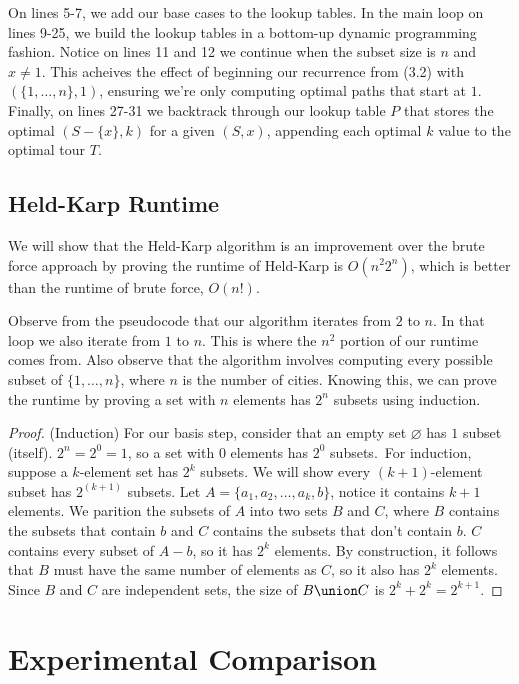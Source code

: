 \documentclass[11pt,fleqn]{article}
\begin{document}
On lines 5-7, we add our base cases to the lookup tables.  In the main loop on
lines 9-25, we build the lookup tables in a bottom-up dynamic programming fashion.
Notice on lines 11 and 12 we continue when the subset size is $n$ and $x \neq 1$.
This acheives the effect of beginning our recurrence from (3.2) with $(\{1,\dots,n\}, 1)$,
ensuring we're only computing optimal paths that start at $1$.  Finally, on lines 27-31
we backtrack through our lookup table $P$ that stores the optimal $(S-\{x\}, k)$
for a given $(S, x)$, appending each optimal $k$ value to the optimal tour $T$.

\subsection{Held-Karp Runtime}
We will show that the Held-Karp algorithm is an improvement over the brute force
approach by proving the runtime of Held-Karp is $O(n^{2}2^n)$, which is better than
the runtime of brute force, $O(n!)$.

Observe from the pseudocode that our algorithm iterates from $2$ to $n$.  In that
loop we also iterate from $1$ to $n$.  This is where the $n^2$ portion of our runtime
comes from.  Also observe that the algorithm involves computing every possible subset
of $\{1,\dots,n\}$, where $n$ is the number of cities.  Knowing this, we can prove the
runtime by proving a set with $n$ elements has $2^n$ subsets using induction.

\begin{proof}
  (Induction) For our basis step, consider that an empty set $\varnothing$ has $1$
  subset (itself).  $2^n = 2^0 = 1$, so a set with $0$ elements has $2^0$ subsets.\
  For induction, suppose a $k$-element set has $2^k$ subsets.  We will show every
  $(k+1)$-element subset has $2^(k+1)$ subsets.  Let $A=\{a_1,a_2,\dots,a_k, b\}$,
  notice it contains $k+1$ elements.  We parition the subsets of $A$ into two sets
  $B$ and $C$, where $B$ contains the subsets that contain $b$ and $C$ contains
  the subsets that don't contain $b$.  $C$ contains every subset of $A-{b}$, so it
  has $2^k$ elements.  By construction, it follows that $B$ must have the same number
  of elements as $C$, so it also has $2^k$ elements.  Since $B$ and $C$ are independent
  sets, the size of $B\union C$ is $2^k + 2^k = 2^{k+1}$.
\end{proof}

\section{Experimental Comparison}
\end{document}
